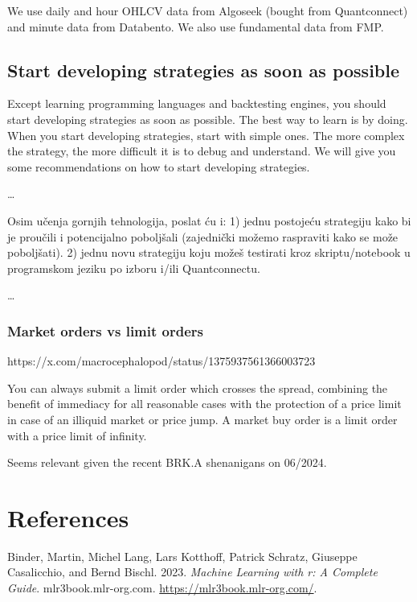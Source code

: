 \documentclass[
  letterpaper,
  DIV=11,
  numbers=noendperiod]{scrreprt}
\newlength{\cslhangindent}
\newenvironment{CSLReferences}[2] %
 {\begin{list}{}{%
  \setlength{\itemindent}{0pt}
  \setlength{\leftmargin}{0pt}
  \setlength{\parsep}{0pt}
  \ifodd #1
   \setlength{\leftmargin}{\cslhangindent}
   \setlength{\itemindent}{-1\cslhangindent}
  \fi
  \setlength{\itemsep}{#2\baselineskip}}}
 {\end{list}}
\begin{document}
We use daily and hour OHLCV data from Algoseek (bought from
Quantconnect) and minute data from Databento. We also use fundamental
data from FMP.

\section{Start developing strategies as soon as
possible}\label{start-developing-strategies-as-soon-as-possible}

Except learning programming languages and backtesting engines, you
should start developing strategies as soon as possible. The best way to
learn is by doing. When you start developing strategies, start with
simple ones. The more complex the strategy, the more difficult it is to
debug and understand. We will give you some recommendations on how to
start developing strategies.

\ldots{}

Osim učenja gornjih tehnologija, poslat ću i: 1) jednu postojeću
strategiju kako bi je proučili i potencijalno poboljšali (zajednički
možemo raspraviti kako se može poboljšati). 2) jednu novu strategiju
koju možeš testirati kroz skriptu/notebook u programskom jeziku po
izboru i/ili Quantconnectu.

\ldots{}

\subsection{Market orders vs limit
orders}\label{market-orders-vs-limit-orders}

https://x.com/macrocephalopod/status/1375937561366003723

You can always submit a limit order which crosses the spread, combining
the benefit of immediacy for all reasonable cases with the protection of
a price limit in case of an illiquid market or price jump. A market buy
order is a limit order with a price limit of infinity.

Seems relevant given the recent BRK.A shenanigans on 06/2024.


\chapter*{References}\label{references}


\label{refs}
\begin{CSLReferences}{1}{0}
Binder, Martin, Michel Lang, Lars Kotthoff, Patrick Schratz, Giuseppe
Casalicchio, and Bernd Bischl. 2023. \emph{Machine Learning with r: A
Complete Guide}. mlr3book.mlr-org.com.
\url{https://mlr3book.mlr-org.com/}.

\end{CSLReferences}
\end{document}
